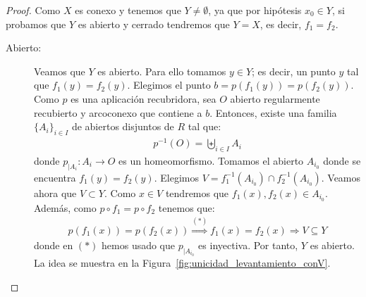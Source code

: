 \begin{lema}
\begin{proof}
        Como $X$ es conexo y tenemos que $Y \neq \emptyset$, ya que por hipótesis $x_0\in Y$, si probamos que $Y$ es abierto y cerrado tendremos que $Y=X$, es decir, $f_1=f_2$.
        \begin{description}
            \item[Abierto:] Veamos que $Y$ es abierto. Para ello tomamos $y\in Y$; es decir, un punto $y$ tal que $f_1(y)=f_2(y)$. Elegimos el punto $b=p(f_1(y))=p(f_2(y))$. Como $p$ es una aplicación recubridora, sea $O$ abierto regularmente recubierto y arcoconexo que contiene a $b$. Entonces, existe una familia $\{A_i\}_{i\in I}$ de abiertos disjuntos de $R$ tal que:
            \begin{gather*}
                p^{-1}(O) = \biguplus\limits_{i\in I} A_i
            \end{gather*}
            donde $p_{|A_i}: A_i \to O$ es un homeomorfismo. Tomamos el abierto $A_{i_0}$ donde se encuentra $f_1(y)=f_2(y)$. Elegimos $V=f_1^{-1}(A_{i_0}) \cap f_2^{-1}(A_{i_0})$. Veamos ahora que $V\subset Y$. Como $x\in V$ tendremos que $f_1(x),f_2(x)\in A_{i_0}$. Además, como $p\circ f_1=p\circ f_2$ tenemos que:
            \begin{gather*}
                p(f_1(x)) = p(f_2(x)) \overset{(\ast)}{\Rightarrow} f_1(x)=f_2(x) \Rightarrow V\subseteq Y
            \end{gather*}
            donde en $(\ast)$ hemos usado que $p_{|A_{i_0}}$ es inyectiva. Por tanto, $Y$ es abierto. La idea se muestra en la Figura~\ref{fig:unicidad_levantamiento_conV}.
            \begin{figure}[ht]
                \centering
\end{figure}
\end{description}
\end{proof}
\end{lema}
